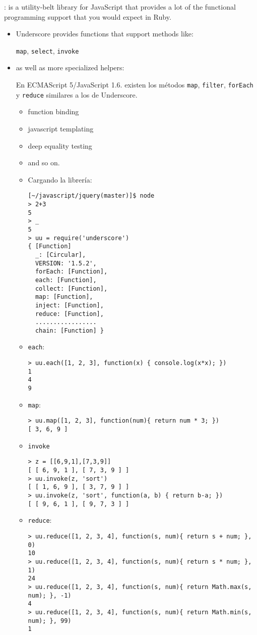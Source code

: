 
:
is a utility-belt library for JavaScript that provides a
lot of the functional programming support that you would expect in
Ruby.

\begin{itemize}
\item
Underscore provides functions that support 
methods like: 

\verb|map|, \verb|select|, \verb|invoke|  

\item
as well as more specialized helpers:

En ECMAScript 5/JavaScript 1.6.  existen los métodos 
\verb|map|, \verb|filter|, \verb|forEach| y  \verb|reduce| similares
a los de Underscore.

\begin{itemize}
\item
function binding
\item
 javascript templating
\item
 deep equality testing
\item
 and so on. 
\end{itemize}

\begin{itemize}
\item
Cargando la librería:
\begin{verbatim}
[~/javascript/jquery(master)]$ node
> 2+3
5
> _
5
> uu = require('underscore')
{ [Function]
  _: [Circular],
  VERSION: '1.5.2',
  forEach: [Function],
  each: [Function],
  collect: [Function],
  map: [Function],
  inject: [Function],
  reduce: [Function],
  .................
  chain: [Function] }
\end{verbatim}

\item \verb|each|:

\begin{verbatim}
> uu.each([1, 2, 3], function(x) { console.log(x*x); })
1
4
9
\end{verbatim}

\item
\verb|map|:
\begin{verbatim}
> uu.map([1, 2, 3], function(num){ return num * 3; })
[ 3, 6, 9 ]
\end{verbatim}
\item \verb|invoke|
\begin{verbatim}
> z = [[6,9,1],[7,3,9]]
[ [ 6, 9, 1 ], [ 7, 3, 9 ] ]
> uu.invoke(z, 'sort')
[ [ 1, 6, 9 ], [ 3, 7, 9 ] ]
> uu.invoke(z, 'sort', function(a, b) { return b-a; })
[ [ 9, 6, 1 ], [ 9, 7, 3 ] ]
\end{verbatim}
\item
\verb|reduce|:
\begin{verbatim}
> uu.reduce([1, 2, 3, 4], function(s, num){ return s + num; }, 0)
10
> uu.reduce([1, 2, 3, 4], function(s, num){ return s * num; }, 1)
24
> uu.reduce([1, 2, 3, 4], function(s, num){ return Math.max(s, num); }, -1)
4
> uu.reduce([1, 2, 3, 4], function(s, num){ return Math.min(s, num); }, 99)
1
\end{verbatim}


\end{itemize}
\end{itemize}
